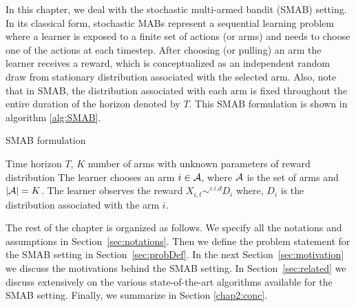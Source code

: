 In this chapter, we deal with the stochastic multi-armed bandit (SMAB) setting. In its classical form, stochastic MABs represent a sequential learning problem where a learner is exposed to a finite set of actions (or arms) and needs to choose one of the actions at each timestep. After choosing (or pulling) an arm the learner receives a reward, which is conceptualized as an independent random draw from stationary distribution associated with the selected arm. Also, note that in SMAB, the distribution associated with each arm is fixed throughout the entire duration of the horizon denoted by $T$. This SMAB formulation is shown in algorithm \ref{alg:SMAB}.

\begin{algorithm}[!th]
\caption{SMAB formulation}
\label{alg:SMAB}
\begin{algorithmic}
 Time horizon $T$, $K$ number of arms with unknown parameters of reward distribution
\State {}
\State The learner chooses an arm $i\in\mathcal{A}$, where $\mathcal{A}$ is the set of arms and $|\mathcal{A}|=K$.
\State The learner observes the reward $X_{i,t}\sim^{i.i.d} D_{i}$ where, $D_{i}$ is the distribution associated with the arm $i$. 
\State \EndFor
\end{algorithmic}
\end{algorithm}
	 
The rest of the chapter is organized as follows. We specify all the notations and assumptions in Section~\ref{sec:notations}. Then we define the problem statement for the SMAB setting in Section~\ref{sec:probDef}. In the next Section~\ref{sec:motivation} we discuss the motivations behind the SMAB setting. In Section~\ref{sec:related} we discuss extensively on the various state-of-the-art algorithms available for the SMAB setting. Finally, we summarize in Section \ref{chap2:conc}.